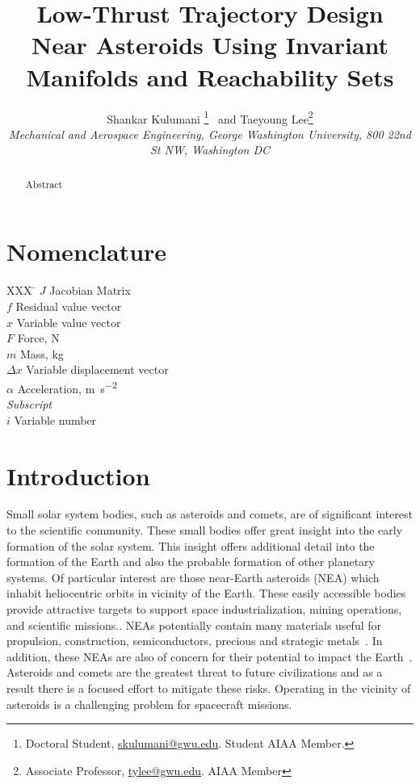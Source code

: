 \documentclass[]{aiaa-tc}%
\title{Low-Thrust Trajectory Design Near Asteroids Using Invariant Manifolds and Reachability Sets}
\author{
  Shankar Kulumani\thanksibid{1}%
    \thanks{Doctoral Student, \href{mailto:skulumani@gwu.edu}{skulumani@gwu.edu}. Student AIAA Member.}
  \ and Taeyoung Lee\thanksibid{2}\thanks{Associate Professor, \href{mailto:tylee@gwu.edu}{tylee@gwu.edu}. AIAA Member}\\
  {\normalsize\itshape
   Mechanical and Aerospace Engineering, George Washington University, 800 22nd St NW, Washington DC }\\
   }
\begin{document}
\maketitle

\begin{abstract}
Abstract
\end{abstract}

\section*{Nomenclature}

\begin{tabbing}
  XXX \= \kill%
  $J$ \> Jacobian Matrix \\
  $f$ \> Residual value vector \\
  $x$ \> Variable value vector \\
  $F$ \> Force, \si{\newton} \\
  $m$ \> Mass, \si{\kilo\gram} \\
  $\Delta x$ \> Variable displacement vector \\
  $\alpha$ \> Acceleration, \si{\meter\per\second\squared} \\[5pt]
  \textit{Subscript}\\
  $i$ \> Variable number \\
\end{tabbing}

\section{Introduction}

Small solar system bodies, such as asteroids and comets, are of significant interest to the scientific community.
These small bodies offer great insight into the early formation of the solar system.
This insight offers additional detail into the formation of the Earth and also the probable formation of other planetary systems.
Of particular interest are those near-Earth asteroids (NEA) which inhabit heliocentric orbits in vicinity of the Earth.
These easily accessible bodies provide attractive targets to support space industrialization, mining operations, and scientific missions..
NEAs potentially contain many materials useful for propulsion, construction, semiconductors, precious and strategic metals~\cite{ross2001}.
In addition, these NEAs are also of concern for their potential to impact the Earth~\cite{wie2008}.
Asteroids and comets are the greatest threat to future civilizations and as a result there is a focused effort to mitigate these risks.
Operating in the vicinity of asteroids is a challenging problem for spacecraft missions.
\end{document}
